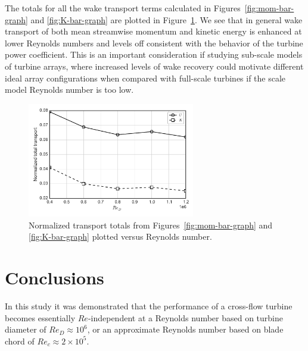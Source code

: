 \documentclass[energies,article,accept,moreauthors,pdftex,12pt,a4paper]{mdpi}
\begin{document}

The totals for all the wake transport terms calculated in 
Figures~\ref{fig:mom-bar-graph} and \ref{fig:K-bar-graph} are plotted in
Figure~\ref{fig:wake-trans-totals}. We see that in general wake transport of 
both mean streamwise momentum and kinetic energy is
enhanced at lower Reynolds numbers and levels off consistent with the behavior
of the  turbine power coefficient. This is an important consideration if
studying sub-scale models of turbine arrays, where increased levels of wake
recovery could motivate different ideal array configurations when compared with
full-scale turbines if the scale model Reynolds number is too low.

\begin{figure}[ht!]
\centering
\includegraphics[width=0.65\textwidth]{figures/wake_trans_totals}
\caption{Normalized transport totals from Figures~\ref{fig:mom-bar-graph} and 
\ref{fig:K-bar-graph} plotted versus Reynolds number.}
\label{fig:wake-trans-totals}
\end{figure}


\section{Conclusions}

In this study it was demonstrated that the performance of a cross-flow turbine
becomes essentially $Re$-independent at a Reynolds number based on turbine 
diameter of $Re_D \approx 10^6$, or an approximate Reynolds number based on 
blade chord of $Re_c \approx 2 \times 10^5$. 

\end{document}
